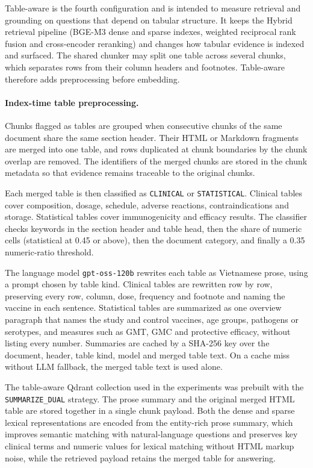 \documentclass[sn-mathphys, oneside]{sn-jnl}
\newcommand{\artifact}[1]{\nolinkurl{#1}}
\begin{document}
Table-aware is the fourth configuration and is intended to measure retrieval and grounding on questions that depend on tabular structure. It keeps the Hybrid retrieval pipeline (BGE-M3 dense and sparse indexes, weighted reciprocal rank fusion and cross-encoder reranking) and changes how tabular evidence is indexed and surfaced. The shared chunker may split one table across several chunks, which separates rows from their column headers and footnotes. Table-aware therefore adds preprocessing before embedding.

\paragraph{Index-time table preprocessing.}
Chunks flagged as tables are grouped when consecutive chunks of the same document share the same section header. Their HTML or Markdown fragments are merged into one table, and rows duplicated at chunk boundaries by the chunk overlap are removed. The identifiers of the merged chunks are stored in the chunk metadata so that evidence remains traceable to the original chunks.

Each merged table is then classified as \artifact{CLINICAL} or \artifact{STATISTICAL}. Clinical tables cover composition, dosage, schedule, adverse reactions, contraindications and storage. Statistical tables cover immunogenicity and efficacy results. The classifier checks keywords in the section header and table head, then the share of numeric cells (statistical at 0.45 or above), then the document category, and finally a 0.35 numeric-ratio threshold.

The language model \artifact{gpt-oss-120b} rewrites each table as Vietnamese prose, using a prompt chosen by table kind. Clinical tables are rewritten row by row, preserving every row, column, dose, frequency and footnote and naming the vaccine in each sentence. Statistical tables are summarized as one overview paragraph that names the study and control vaccines, age groups, pathogens or serotypes, and measures such as GMT, GMC and protective efficacy, without listing every number. Summaries are cached by a SHA-256 key over the document, header, table kind, model and merged table text. On a cache miss without LLM fallback, the merged table text is used alone.

The table-aware Qdrant collection used in the experiments was prebuilt with the \artifact{SUMMARIZE_DUAL} strategy. The prose summary and the original merged HTML table are stored together in a single chunk payload. Both the dense and sparse lexical representations are encoded from the entity-rich prose summary, which improves semantic matching with natural-language questions and preserves key clinical terms and numeric values for lexical matching without HTML markup noise, while the retrieved payload retains the merged table for answering.
\end{document}

